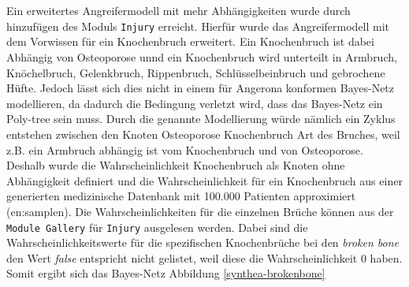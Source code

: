 \documentclass[german,version-2020-11]{uzl-thesis}
\begin{document}
\\ \\
Ein erweitertes Angreifermodell mit mehr Abhängigkeiten wurde durch hinzufügen des Moduls \texttt{Injury} erreicht. Hierfür wurde das Angreifermodell mit dem Vorwissen für ein Knochenbruch erweitert. Ein Knochenbruch ist dabei Abhängig von Osteoporose unnd ein Knochenbruch wird unterteilt in Armbruch, Knöchelbruch, Gelenkbruch, Rippenbruch, Schlüsselbeinbruch und gebrochene Hüfte. Jedoch lässt sich dies nicht in einem für Angerona konformen Bayes-Netz modellieren, da dadurch die Bedingung verletzt wird, dass das Bayes-Netz ein Poly-tree sein muss. Durch die genannte Modellierung würde nämlich ein Zyklus entstehen zwischen den Knoten Osteoporose \leftrightarrow Knochenbruch \leftrightarrow Art des Bruches, weil z.B. ein Armbruch abhängig ist vom Knochenbruch und von Osteoporose. \\ 
Deshalb wurde die Wahrscheinlichkeit Knochenbruch als Knoten ohne Abhängigkeit definiert und die Wahrscheinlichkeit für ein Knochenbruch aus einer generierten medizinische Datenbank mit 100.000 Patienten approximiert (en:samplen). Die Wahrscheinlichkeiten für die einzelnen Brüche können aus der \texttt{Module Gallery} für \texttt{Injury} ausgelesen werden. Dabei sind die Wahrscheinlichkeitswerte für die spezifischen Knochenbrüche bei den \textit{broken bone} den Wert \textit{false} entspricht nicht gelistet, weil diese die Wahrscheinlichkeit 0 haben. Somit ergibt sich das Bayes-Netz Abbildung \ref{synthea-brokenbone}
\end{document}
